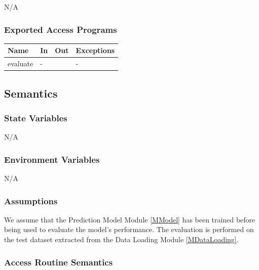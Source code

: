 \documentclass[12pt, titlepage]{article}
\begin{document}
N/A

\subsubsection{Exported Access Programs}

\begin{center}
\begin{tabular}{p{4cm} p{4cm} p{4cm} p{2cm}}
\hline
\textbf{Name} & \textbf{In} & \textbf{Out} & \textbf{Exceptions} \\
\hline
evaluate & -  &  & - \\
\hline
\end{tabular}
\end{center}

\subsection{Semantics}

\subsubsection{State Variables}

N/A

\subsubsection{Environment Variables}

N/A

\subsubsection{Assumptions}

We assume that the Prediction Model Module \ref{MModel} has been trained
before being used to evaluate the model's performance. The evaluation is
performed on the test dataset extracted from the Data Loading Module
\ref{MDataLoading}.

\subsubsection{Access Routine Semantics}
\end{document}
